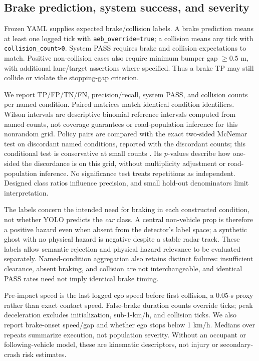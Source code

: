 \documentclass[conference]{IEEEtran}
\begin{document}
\subsection{Brake prediction, system success, and severity}
Frozen YAML supplies expected brake/collision labels. A brake prediction means
at least one logged tick with \texttt{aeb\_override=true}; a collision means any
tick with \texttt{collision\_count>0}. System PASS requires brake and collision
expectations to match. Positive non-collision cases also require minimum bumper
gap $\geq0.5$ m, with additional lane/target assertions where specified. Thus a
brake TP may still collide or violate the stopping-gap criterion.

We report TP/FP/TN/FN, precision/recall, system PASS, and collision counts per
named condition. Paired matrices match identical condition identifiers. Wilson
intervals \cite{wilson1927} are descriptive binomial reference intervals computed from named
counts, not coverage guarantees or road-population inference for this nonrandom
grid. Policy pairs are compared with the exact two-sided McNemar test
\cite{mcnemar1947} on discordant named conditions, reported with the discordant
counts; this conditional test is conservative at small counts
\cite{fagerland2013mcnemar}. Its $p$-values describe how one-sided the
discordance is on this grid, without multiplicity adjustment or road-population
inference. No significance test treats repetitions as independent. Designed class
ratios influence precision, and small hold-out denominators limit interpretation.

The labels concern the intended need for braking in each constructed condition,
not whether YOLO predicts the \emph{car} class. A central non-vehicle prop is
therefore a positive hazard even when absent from the detector's label space;
a synthetic ghost with no physical hazard is negative despite a stable radar
track. These labels allow semantic rejection and physical hazard relevance to
be evaluated separately. Named-condition aggregation also retains distinct
failures: insufficient clearance, absent braking, and collision are not
interchangeable, and identical PASS rates need not imply identical brake timing.

Pre-impact speed is the last logged ego speed before first collision, a 0.05-s
proxy rather than exact contact speed. False-brake duration counts override
ticks; peak deceleration excludes initialization, sub-1-km/h, and collision
ticks. We also report brake-onset speed/gap and whether ego stops below 1 km/h.
Medians over repeats summarize execution, not population severity. Without an
occupant or following-vehicle model, these are kinematic descriptors, not injury
or secondary-crash risk estimates.
\end{document}
